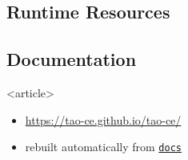 \subsection{Runtime Resources}
\begin{frame}[t]
\begin{dirtreex}[box={false},fontsize=\small]
\end{dirtreex}
\end{frame}

\subsection<article>{\taocerepo Documentation}
\begin{frame}<article>
    \bigicon{\faBook}
\begin{itemize}
    \item \url{https://tao-ce.github.io/tao-ce/}
    \item rebuilt automatically from \href{https://github.com/tao-ce/tao-ce/tree/main/docs}{\texttt{docs}}
\end{itemize}
\end{frame}

